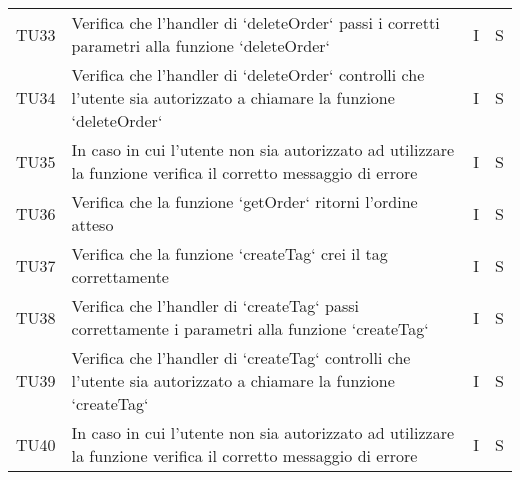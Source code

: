 \begin{center}
\begin{longtable}[!h]{p{45px} p{255px} p{35px} p{35px}}
        TU33          & Verifica che l'handler di `deleteOrder` passi i corretti parametri alla funzione `deleteOrder`                                                                                                   & I              & S              \\
        TU34          & Verifica che l'handler di `deleteOrder` controlli che l'utente sia autorizzato a chiamare la funzione `deleteOrder`                                                                              & I              & S              \\
        TU35          & In caso in cui l'utente non sia autorizzato ad utilizzare la funzione verifica il corretto messaggio di errore                                                                                   & I              & S              \\
        TU36          & Verifica che la funzione `getOrder` ritorni l'ordine atteso                                                                                                                                      & I              & S              \\
        TU37          & Verifica che la funzione `createTag` crei il tag correttamente                                                                                                                                   & I              & S              \\
        TU38          & Verifica che l'handler di `createTag` passi correttamente i parametri alla funzione `createTag`                                                                                                  & I              & S              \\
        TU39          & Verifica che l'handler di `createTag` controlli che l'utente sia autorizzato a chiamare la funzione `createTag`                                                                                  & I              & S              \\
        TU40          & In caso in cui l'utente non sia autorizzato ad utilizzare la funzione verifica il corretto messaggio di errore                                                                                   & I              & S              \\


\end{longtable}
\end{center}
